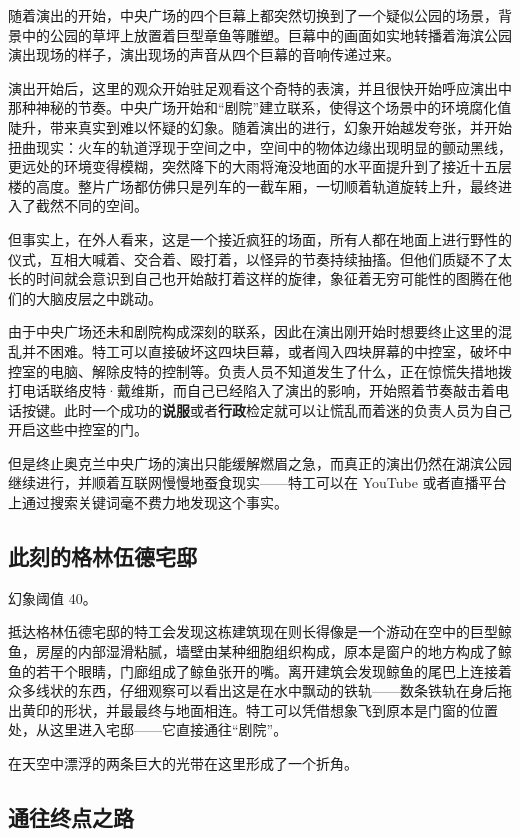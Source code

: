 随着演出的开始，中央广场的四个巨幕上都突然切换到了一个疑似公园的场景，背景中的公园的草坪上放置着巨型章鱼等雕塑。巨幕中的画面如实地转播着海滨公园演出现场的样子，演出现场的声音从四个巨幕的音响传递过来。

演出开始后，这里的观众开始驻足观看这个奇特的表演，并且很快开始呼应演出中那种神秘的节奏。中央广场开始和“剧院”建立联系，使得这个场景中的环境腐化值陡升，带来真实到难以怀疑的幻象。随着演出的进行，幻象开始越发夸张，并开始扭曲现实：火车的轨道浮现于空间之中，空间中的物体边缘出现明显的颤动黑线，更远处的环境变得模糊，突然降下的大雨将淹没地面的水平面提升到了接近十五层楼的高度。整片广场都仿佛只是列车的一截车厢，一切顺着轨道旋转上升，最终进入了截然不同的空间。

但事实上，在外人看来，这是一个接近疯狂的场面，所有人都在地面上进行野性的仪式，互相大喊着、交合着、殴打着，以怪异的节奏持续抽搐。但他们质疑不了太长的时间就会意识到自己也开始敲打着这样的旋律，象征着无穷可能性的图腾在他们的大脑皮层之中跳动。

由于中央广场还未和剧院构成深刻的联系，因此在演出刚开始时想要终止这里的混乱并不困难。特工可以直接破坏这四块巨幕，或者闯入四块屏幕的中控室，破坏中控室的电脑、解除皮特的控制等。负责人员不知道发生了什么，正在惊慌失措地拨打电话联络皮特·戴维斯，而自己已经陷入了演出的影响，开始照着节奏敲击着电话按键。此时一个成功的\textbf{说服}或者\textbf{行政}检定就可以让慌乱而着迷的负责人员为自己开启这些中控室的门。

但是终止奥克兰中央广场的演出只能缓解燃眉之急，而真正的演出仍然在湖滨公园继续进行，并顺着互联网慢慢地蚕食现实——特工可以在 YouTube 或者直播平台上通过搜索关键词毫不费力地发现这个事实。

\subsection{此刻的格林伍德宅邸}

幻象阈值 40。

抵达格林伍德宅邸的特工会发现这栋建筑现在则长得像是一个游动在空中的巨型鲸鱼，房屋的内部湿滑粘腻，墙壁由某种细胞组织构成，原本是窗户的地方构成了鲸鱼的若干个眼睛，门廊组成了鲸鱼张开的嘴。离开建筑会发现鲸鱼的尾巴上连接着众多线状的东西，仔细观察可以看出这是在水中飘动的铁轨——数条铁轨在身后拖出黄印的形状，并最最终与地面相连。特工可以凭借想象飞到原本是门窗的位置处，从这里进入宅邸——它直接通往“剧院”。

在天空中漂浮的两条巨大的光带在这里形成了一个折角。

\subsection{通往终点之路}

